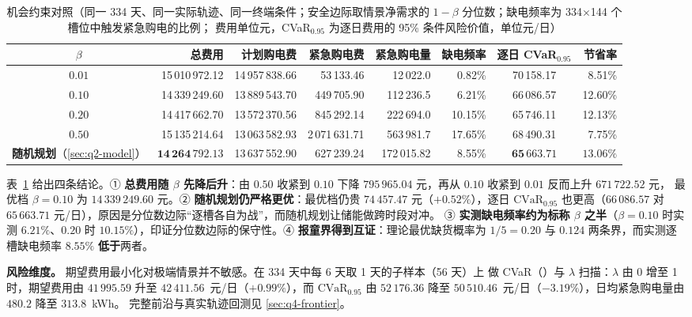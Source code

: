 \begin{table}[htbp]
  \centering
  \caption{机会约束对照（同一 334 天、同一实际轨迹、同一终端条件；安全边际取情景净需求的
           $1-\beta$ 分位数；缺电频率为 334$\times$144 个槽位中触发紧急购电的比例；
           费用单位元，CVaR$_{0.95}$ 为逐日费用的 95\% 条件风险价值，单位元/日）}
  \label{tab:chance}
  \small
  \setlength{\tabcolsep}{3pt}
  \begin{tabular}{crrrrrcr}
    \toprule
    $\beta$ & 总费用 & 计划购电费 & 紧急购电费 & 紧急购电量 & 缺电频率 & 逐日 CVaR$_{0.95}$ & 节省率 \\
    \midrule
    $0.01$ & 15\,010\,972.12 & 14\,957\,838.66 & 53\,133.46 & 12\,022.0 & 0.82\% & 70\,158.17 & 8.51\% \\
    $0.10$ & 14\,339\,249.60 & 13\,889\,543.70 & 449\,705.90 & 112\,236.5 & 6.21\% & 66\,086.57 & 12.60\% \\
    $0.20$ & 14\,417\,662.70 & 13\,572\,370.56 & 845\,292.14 & 222\,694.0 & 10.15\% & 65\,746.11 & 12.13\% \\
    $0.50$ & 15\,135\,214.64 & 13\,063\,582.93 & 2\,071\,631.71 & 563\,981.7 & 17.65\% & 68\,490.31 & 7.75\% \\
    \midrule
    \textbf{随机规划}（\ref{sec:q2-model}） & $\mathbf{14\,264\,792.13}$ & 13\,637\,552.90 & 627\,239.24 & 172\,015.82 & 8.55\% & $\mathbf{65\,663.71}$ & $\mathbf{13.06\%}$ \\
    \bottomrule
  \end{tabular}
\end{table}

表~\ref{tab:chance} 给出四条结论。① \textbf{总费用随 \(\beta\) 先降后升}：由 \(0.50\) 收紧到
\(0.10\) 下降 \(795\,965.04\) 元，再从 \(0.10\) 收紧到 \(0.01\) 反而上升 \(671\,722.52\) 元，
最优档 \(\beta=0.10\) 为 \(14\,339\,249.60\) 元。② \textbf{随机规划仍严格更优}：最优档仍贵
\(74\,457.47\) 元（\(+0.52\%\)），逐日 \(\mathrm{CVaR}_{0.95}\) 也更高（\(66\,086.57\) 对
\(65\,663.71\) 元/日），原因是分位数边际“逐槽各自为战”，而随机规划让储能做跨时段对冲。
③ \textbf{实测缺电频率约为标称 \(\beta\) 之半}（\(\beta=0.10\) 时实测 \(6.21\%\)、\(0.20\) 时
\(10.15\%\)），印证分位数边际的保守性。④ \textbf{报童界得到互证}：理论最优缺货概率为
\(1/5=0.20\) 与 \(0.124\) 两条界，而实测逐槽缺电频率 \(8.55\%\) \textbf{低于}两者。

\textbf{风险维度。} 期望费用最小化对极端情景并不敏感。在 334 天中每 6 天取 1 天的子样本（56 天）上
做 CVaR（）与 \(\lambda\) 扫描：\(\lambda\) 由 0 增至 1 时，期望费用由 \(41\,995.59\)
升至 \(42\,411.56\)~元/日（\(+0.99\%\)），而 \(\mathrm{CVaR}_{0.95}\) 由 \(52\,176.36\) 降至
\(50\,510.46\)~元/日（\(-3.19\%\)），日均紧急购电量由 \(480.2\) 降至 \(313.8\)~kWh。
完整前沿与真实轨迹回测见 \ref{sec:q4-frontier}。

